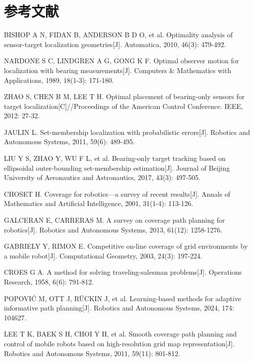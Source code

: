 \documentclass[12pt,a4paper]{ctexart}
\begin{document}
\section{参考文献}

\begin{enumerate}[leftmargin=2.2em,itemsep=3pt,label={[\arabic*]}]
  \item BISHOP A N, FIDAN B, ANDERSON B D O, et al. Optimality analysis of sensor-target localization geometries[J]. Automatica, 2010, 46(3): 479-492.
  \item NARDONE S C, LINDGREN A G, GONG K F. Optimal observer motion for localization with bearing measurements[J]. Computers \& Mathematics with Applications, 1989, 18(1-3): 171-180.
  \item ZHAO S, CHEN B M, LEE T H. Optimal placement of bearing-only sensors for target localization[C]//Proceedings of the American Control Conference. IEEE, 2012: 27-32.
  \item JAULIN L. Set-membership localization with probabilistic errors[J]. Robotics and Autonomous Systems, 2011, 59(6): 489-495.
  \item LIU Y S, ZHAO Y, WU F L, et al. Bearing-only target tracking based on ellipsoidal outer-bounding set-membership estimation[J]. Journal of Beijing University of Aeronautics and Astronautics, 2017, 43(3): 497-505.
  \item CHOSET H. Coverage for robotics---a survey of recent results[J]. Annals of Mathematics and Artificial Intelligence, 2001, 31(1-4): 113-126.
  \item GALCERAN E, CARRERAS M. A survey on coverage path planning for robotics[J]. Robotics and Autonomous Systems, 2013, 61(12): 1258-1276.
  \item GABRIELY Y, RIMON E. Competitive on-line coverage of grid environments by a mobile robot[J]. Computational Geometry, 2003, 24(3): 197-224.
  \item CROES G A. A method for solving traveling-salesman problems[J]. Operations Research, 1958, 6(6): 791-812.
  \item POPOVI\'{C} M, OTT J, R\"{U}CKIN J, et al. Learning-based methods for adaptive informative path planning[J]. Robotics and Autonomous Systems, 2024, 174: 104627.
  \item LEE T K, BAEK S H, CHOI Y H, et al. Smooth coverage path planning and control of mobile robots based on high-resolution grid map representation[J]. Robotics and Autonomous Systems, 2011, 59(11): 801-812.
\end{enumerate}
\end{document}
